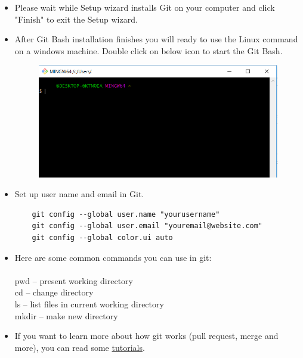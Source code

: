 \documentclass[10pt]{article} %
\begin{document}
\begin{itemize}
  \item Please wait while Setup wizard installs Git on your computer and click "Finish" to exit the Setup wizard.

  \item After Git Bash installation finishes you will ready to use the Linux command on a windows machine.
  Double click on below icon to start the Git Bash.

  \begin{figure}[h!]
    \centering
    \includegraphics[width=0.7\linewidth]{figs/Launch-Git-Bash.png}
    \caption{}
    \label{fig:launchgitbash}
  \end{figure}

  \item Set up user name and email in Git.

  \begin{lstlisting}
    git config --global user.name "yourusername"
    git config --global user.email "youremail@website.com"
    git config --global color.ui auto
  \end{lstlisting}

  \item Here are some common commands you can use in git:
  \\
  \\
  pwd -- present working directory\\
  cd -- change directory\\
  ls -- list files in current working directory\\
  mkdir -- make new directory\\

  \item If you want to learn more about how git works (pull request, merge and more), you can read some \href{https://www.atlassian.com/git}{tutorials}.

\end{itemize}
\end{document}
